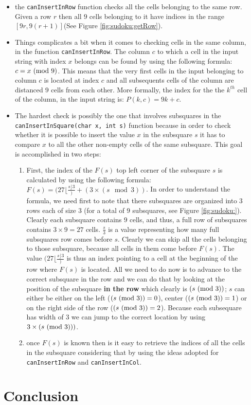 \begin{itemize}
	\item the \lstinline[columns=fixed]{canInsertInRow} function checks all the cells belonging to
	the same row. Given a row $r$ then all $9$ cells belonging to it have indices in the range
	$[9r,9(r+1)]$(See Figure \ref{fig:sudoku:getRow}).
	\item Things complicates a bit when it comes to checking cells in the same column, in the
	function \lstinline[columns=fixed]{canInsertInRow}. The column $c$ to which a cell in the input
	string with index $x$ belongs can be found by using the following formula: $c = x \ (\mathrm{mod}\ 9)$. This
	means that the very first cells in the input belonging to column $c$ is located at index $c$ and
	all subsequents cells of the column are distanced $9$ cells from each other. More formally, the
	index for the the $k^{th}$ cell of the column, in the input string is: $P(k,c) = 9k+c$.
	\item The hardest check is possibly the one that involves subsquares in the
	\lstinline[columns=fixed]{canInsertInSquare(char x, int s)} function because in order to check
	whether it is possible to insert the value $x$ in the subsquare $s$ it has to compare $x$ to all
	the other non-empty cells of the same subsquare. This goal is accomplished in two steps:
	\begin{enumerate}
		\item First, the index of the $F(s)$ top left corner of the subsquare $s$ is calculated  by
		using the following formula: $F(s) = (27 \lfloor \frac{s \rfloor{3}}) + (3\times (s \mod{3}))$.  In
		order to understand the formula, we need first to note that there subsquares are organized
		into $3$ rows each of size $3$ (for a total of 9 subsquares, see Figure \ref{fig:sudoku:}).
		Clearly each subsquare contains $9$ cells, and thus, a full row of subsquares contains
		$3\times9 =27$ cells. $\frac{s}{3}$ is a value representing how many full subsquares row
		comes before $s$. Clearly we can skip all the cells belonging to those subsquare, because
		all cells in them come before $F(s)$. The value $(27 \lfloor \frac{s \rfloor{3}})$ is thus an index
		pointing to a cell at the beginning of the row where $F(s)$ is located. All we need to do
		now is to advance to the correct subsquare in the row and we can do that by looking at the
		position of the subsquare \textbf{in the row} which clearly is $(s \ (\mathrm{mod}\ 3))$; $s$ can either
		be either on the left ($(s \ (\mathrm{mod}\ 3))=0$), center ($(s \ (\mathrm{mod}\ 3))=1$) or on the right side of
		the row ($(s \ (\mathrm{mod}\ 3))=2$). Because each subsequare has width of $3$ we can jump to the
		correct location by using $3\times  (s \ (\mathrm{mod}\ 3)))$. 
		\item once $F(s)$ is known then is it easy to retrieve the indices of all the cells in the
		subsquare considering that by using the ideas adopted for
		\lstinline[columns=fixed]{canInsertInRow} and \lstinline[columns=fixed]{canInsertInCol}.
	\end{enumerate}
	
\end{itemize}





\section{Conclusion}



